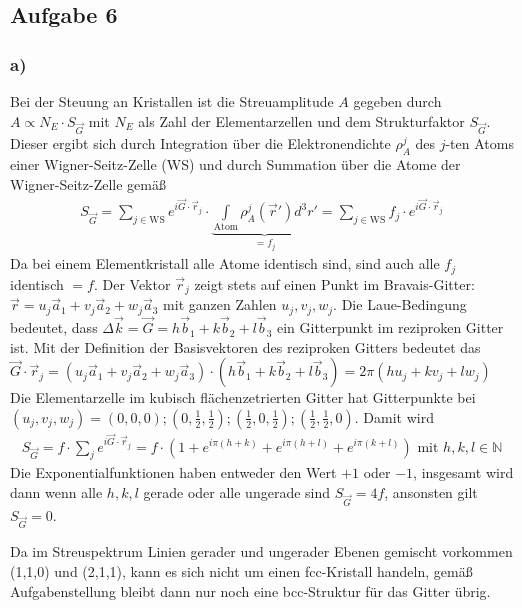 \documentclass[11pt]{article}
\newcommand*{\NN}{\mathbb N}
\begin{document}
\subsection*{Aufgabe 6}
\subsubsection*{a)}
Bei der Steuung an Kristallen ist die Streuamplitude $A$ gegeben durch
$A \propto N_E \cdot S_{\vec G}$ mit $N_E$ als Zahl der Elementarzellen und
dem Strukturfaktor $S_{\vec G}$. Dieser ergibt sich durch Integration über die
Elektronendichte $\rho_A^j$ des $j$-ten Atoms einer Wigner-Seitz-Zelle (WS)
und durch Summation über die Atome der Wigner-Seitz-Zelle gemäß
\begin{align*}
  S_{\vec G} = \sum_{j \in \text{WS}} e^{i \vec G \cdot \vec r_j} \cdot \underbrace{
   \int \limits_{\text{Atom}}\rho_A^j (\vec r') d^3 r'}_{= f_j} =
   \sum_{j \in \text{WS}} f_j \cdot e^{i \vec G \cdot \vec r_j}
\end{align*}
Da bei einem Elementkristall alle Atome identisch sind, sind auch alle $f_j$
identisch $= f$. Der Vektor $\vec r_j$ zeigt stets auf einen Punkt
im Bravais-Gitter: $\vec r = u_j \vec a_1 + v_j \vec a_2 + w_j \vec a_3$ mit
ganzen Zahlen $u_j, v_j, w_j$. Die Laue-Bedingung bedeutet, dass
$\Delta \vec k = \vec G = h \vec b_1 + k \vec b_2 + l \vec b_3$ ein Gitterpunkt
im reziproken Gitter ist. Mit der Definition der Basisvektoren des reziproken
Gitters bedeutet das $\vec G \cdot \vec r_j =  (u_j \vec a_1 + v_j \vec a_2 + w_j \vec a_3)
\cdot (h \vec b_1 + k \vec b_2 + l \vec b_3) = 2 \pi (h u_j + k v_j + l w_j)$
Die Elementarzelle im kubisch flächenzetrierten Gitter hat Gitterpunkte bei
$(u_j,v_j,w_j) = (0,0,0); (0,\frac{1}{2},\frac{1}{2}); (\frac{1}{2}, 0, \frac{1}{2});
(\frac{1}{2},\frac{1}{2}, 0)$. Damit wird
\begin{align*}
  S_{\vec G} = f \cdot \sum_{j}  e^{i \vec G \cdot \vec r_j} =
  f \cdot \left(1 + e^{i \pi (h + k)} + e^{i \pi (h + l)} +e^{i \pi (k + l)} \right)
  \text{ mit } h, k, l \in \NN
\end{align*}
Die Exponentialfunktionen haben entweder den Wert $+1$ oder $-1$, insgesamt wird dann
wenn alle $h, k, l$ gerade oder alle ungerade sind $S_{\vec G} = 4 f$, ansonsten gilt
$S_{\vec G} = 0$.

Da im Streuspektrum Linien gerader und ungerader Ebenen gemischt vorkommen
(1,1,0) und (2,1,1), kann es sich nicht um einen fcc-Kristall handeln,
gemäß Aufgabenstellung bleibt dann nur noch eine bcc-Struktur für das Gitter übrig.
\end{document}
